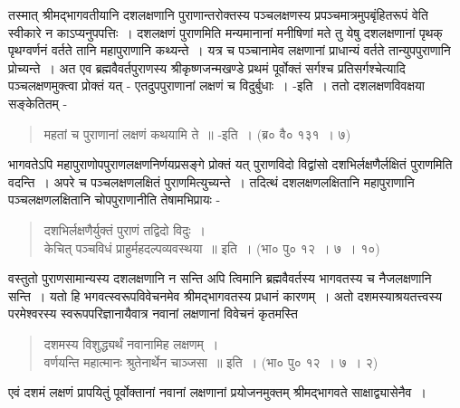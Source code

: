 {तस्मात् श्रीमद्भागवतीयानि दशलक्षणानि पुराणान्तरोक्तस्य पञ्चलक्षणस्य प्रपञ्चमात्रमुप\-बृंहितरूपं वेति स्वीकारे न काऽप्यनुपपत्तिः~। दशलक्षणं पुराणमिति मन्यमानानां मनीषिणां मते तु येषु दशलक्षणानां पृथक् पृथग्वर्णनं वर्तते तानि महापुराणानि कथ्यन्ते~। यत्र च पञ्चानामेव लक्षणानां प्राधान्यं वर्तते तान्युपपुराणानि प्रोच्यन्ते~। अत एव ब्रह्मवैवर्तपुराणस्य श्रीकृष्णजन्मखण्डे प्रथमं पूर्वोक्तं सर्गश्च प्रतिसर्गश्चेत्यादि पञ्चलक्षणमुक्त्वा प्रोक्तं यत् - एतदुपपुराणानां लक्षणं च विदुर्बुधाः~। -इति~। ततो दशलक्षणविवक्षया सङ्केतितम् -
\begin{verse}
महतां च पुराणानां लक्षणं कथयामि ते~॥ -इति~। (ब्र० वै० १३१~। ७)
\end{verse}
भागवतेऽपि महापुराणोपपुराणलक्षणनिर्णयप्रसङ्गे प्रोक्तं यत् पुराणविदो विद्वांसो दशभिर्लक्षणै\-र्लक्षितं पुराणमिति वदन्ति~। अपरे च पञ्चलक्षणलक्षितं पुराणमित्युच्यन्ते~। तदित्थं दशलक्षणलक्षितानि महापुराणानि पञ्चलक्षणलक्षितानि चोपपुराणानीति तेषामभिप्रायः -
\begin{verse}
दशभिर्लक्षणैर्युक्तं पुराणं तद्विदो विदुः~। \\
केचित् पञ्चविधं प्राहुर्महदल्पव्यवस्थया~॥ इति~। (भा० पु० १२~। ७~। १०)
\end{verse}
वस्तुतो पुराणसामान्यस्य दशलक्षणानि न सन्ति अपि त्विमानि ब्रह्मवैवर्तस्य भागवतस्य च नैजलक्षणानि सन्ति~। यतो हि भगवत्स्वरूपविवेचनमेव श्रीमद्भागवतस्य प्रधानं कारणम्~। अतो दशमस्याश्रयतत्त्वस्य परमेश्वरस्य स्वरूपपरिज्ञानायैवात्र नवानां लक्षणानां विवेचनं कृतमस्ति 
\begin{verse}
दशमस्य विशुद्ध्यर्थं नवानामिह लक्षणम्~। \\
वर्णयन्ति महात्मानः श्रुतेनार्थेन चाञ्जसा~॥ इति~। (भा० पु० १२~। ७~। २)
\end{verse}
एवं दशमं लक्षणं प्रापयितुं पूर्वोक्तानां नवानां लक्षणानां प्रयोजनमुक्तम् श्रीमद्भागवते साक्षाद्व्यासेनैव~। 

\articleend
}


